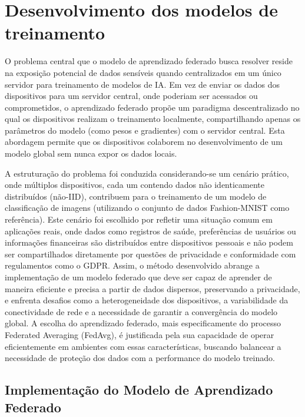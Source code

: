 \chapter[Desenvolvimento dos modelos de treinamento]{Desenvolvimento dos modelos de treinamento}
\label{chap:desenvolvimento}

O problema central que o modelo de aprendizado federado busca resolver reside na exposição potencial de dados sensíveis quando centralizados em um único servidor para treinamento de modelos de IA. Em vez de enviar os dados dos dispositivos para um servidor central, onde poderiam ser acessados ou comprometidos, o aprendizado federado propõe um paradigma descentralizado no qual os dispositivos realizam o treinamento localmente, compartilhando apenas os parâmetros do modelo (como pesos e gradientes) com o servidor central. Esta abordagem permite que os dispositivos colaborem no desenvolvimento de um modelo global sem nunca expor os dados locais. 

A estruturação do problema foi conduzida considerando-se um cenário prático, onde múltiplos dispositivos, cada um contendo dados não identicamente distribuídos (não-IID), contribuem para o treinamento de um modelo de classificação de imagens (utilizando o conjunto de dados Fashion-MNIST como referência). Este cenário foi escolhido por refletir uma situação comum em aplicações reais, onde dados como registros de saúde, preferências de usuários ou informações financeiras são distribuídos entre dispositivos pessoais e não podem ser compartilhados diretamente por questões de privacidade e conformidade com regulamentos como o GDPR. Assim, o método desenvolvido abrange a implementação de um modelo federado que deve ser capaz de aprender de maneira eficiente e precisa a partir de dados dispersos, preservando a privacidade, e enfrenta desafios como a heterogeneidade dos dispositivos, a variabilidade da conectividade de rede e a necessidade de garantir a convergência do modelo global. A escolha do aprendizado federado, mais especificamente do processo Federated Averaging (FedAvg), é justificada pela sua capacidade de operar eficientemente em ambientes com essas características, buscando balancear a necessidade de proteção dos dados com a performance do modelo treinado.

\section{Implementação do Modelo de Aprendizado Federado}

